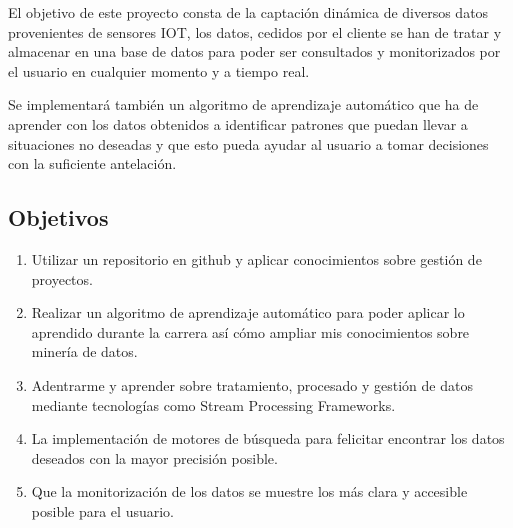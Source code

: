 
El objetivo de este proyecto consta de la captación dinámica de diversos datos provenientes de sensores IOT, los datos, cedidos por el cliente se han de tratar y almacenar en una base de datos para poder ser consultados y monitorizados por el usuario en cualquier momento y a tiempo real. 

Se implementará también un algoritmo de aprendizaje automático que ha de aprender con los datos obtenidos a identificar patrones que puedan llevar a situaciones no deseadas y que esto pueda ayudar al usuario a tomar decisiones con la suficiente antelación.

\subsection{Objetivos}

\begin{enumerate}
    \item Utilizar un repositorio en github y aplicar conocimientos sobre gestión de proyectos.
    \item Realizar un algoritmo de aprendizaje automático para poder aplicar lo aprendido durante la carrera así cómo ampliar mis conocimientos sobre minería de datos.
    \item Adentrarme y aprender sobre tratamiento, procesado y gestión de datos mediante tecnologías como Stream Processing Frameworks.
    \item La implementación de motores de búsqueda para felicitar encontrar los datos deseados con la mayor precisión posible.
    \item Que la monitorización de los datos se muestre los más clara y accesible posible para el usuario.
\end{enumerate}

